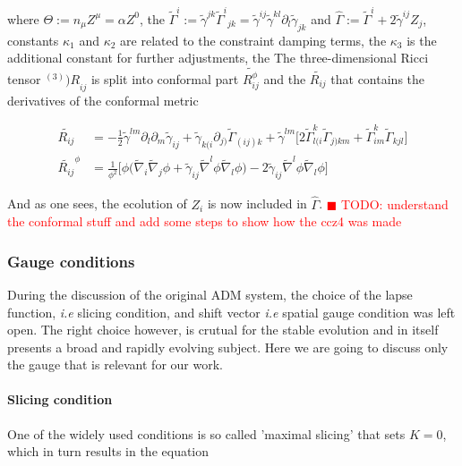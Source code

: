 \documentclass[11pt,a4paper,headinclude=true,DIV=14,BCOR=8mm,chapterprefix,listof=totoc,twoside,openright,abstracton]{scrbook}
\newcommand{\todo}[1]{\textcolor{red}{$\blacksquare$ TODO: #1}}
\begin{document}
where $\Theta:=n_{\mu}Z^{\mu}=\alpha Z^0$, the $\widetilde{\Gamma}^i:=\widetilde{\gamma}^{jk}{\widetilde{\Gamma}^i}_{jk} = \widetilde{\gamma}^{ij}\widetilde{\gamma}^{kl}\partial_{l}\widetilde{\gamma}_{jk}$ and $\hat{\Gamma}:=\widetilde{\Gamma}^i + 2\widetilde{\gamma}^{ij}Z_j$, constants $\kappa_1$ and $\kappa_2$ are related to the constraint damping terms, the $\kappa_3$ is the additional constant for further adjustments, the The three-dimensional Ricci tensor ${^{(3)})R}_{ij}$ is split into conformal part $\widetilde{R_{ij}^{\phi}}$ and the $\widetilde{R_{ij}}$ that contains the derivatives of the conformal metric

\begin{align}
    \widetilde{R_{ij}} &= -\frac{1}{2}\widetilde{\gamma}^{lm}\partial_{l}\partial_{m}\widetilde{\gamma}_{ij} + \widetilde{\gamma}_{k(i}\partial_{j)}\widetilde{\Gamma}_{(ij)k} + \widetilde{\gamma}^{lm}\big[2\widetilde{\Gamma}^{k}_{l(i}\widetilde{\Gamma}_{j)km} + \widetilde{\Gamma}^{k}_{im}\widetilde{\Gamma}_{kjl}\big] \\
    \widetilde{R_{ij}}^{\phi} &= \frac{1}{\phi^2}\big[\phi\big(\widetilde{\nabla}_{i}\widetilde{\nabla}_{j}\phi + \widetilde{\gamma}_{ij}\widetilde{\nabla}^{l}\phi\widetilde{\nabla}_{l}\phi\big) - 2\widetilde{\gamma}_{ij}\widetilde{\nabla}^{l}\phi\widetilde{\nabla}_{l}\phi\big]
\end{align}

And as one sees, the ecolution of $Z_i$ is now included in $\hat{\Gamma}$. 
\todo{understand the conformal stuff and add some steps to show how the ccz4 was made}

\subsubsection{Gauge conditions}

During the discussion of the original ADM system, the choice of the lapse function, \textit{i.e} slicing condition, and shift vector \textit{i.e} spatial gauge condition was left open. The right choice however, is crutual for the stable evolution and in itself presents a broad and rapidly evolving subject. Here we are going to discuss only the gauge that is relevant for our work. 

\paragraph{Slicing condition} One of the widely used conditions is so called 'maximal slicing' that sets $K=0$, which in turn results in the equation
\end{document}
